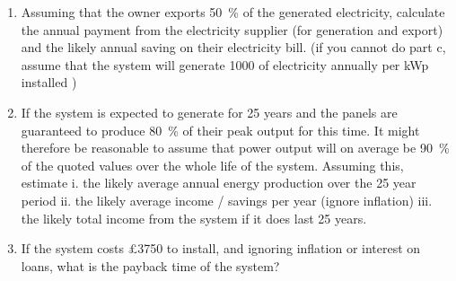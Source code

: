 \documentclass[crop=false,parskip=half]{scrartcl} %
\begin{document}
\begin{question}
\begin{enumerate} [label=\alph*)]
\item Assuming that the owner exports \SI{50}{\percent} of the generated electricity, calculate the annual payment from the electricity supplier (for generation and export) and the likely annual saving on their electricity bill. (if you cannot do part c, assume that the system will generate \SI{1000}{\kilowatthour} of electricity annually per kWp installed )
\item If the system is expected to generate for 25 years and the panels are guaranteed to produce \SI{80}{\percent} of their peak output for this time. It might therefore be reasonable to assume that power output will on average be \SI{90}{\percent} of the quoted values over the whole life of the system. Assuming this, estimate
i.	the likely average annual energy production over the 25 year period 
ii.	the likely average income / savings per year (ignore inflation)
iii.	the likely total income from the system if it does last 25 years.
\item If the system costs £3750 to install, and ignoring inflation or interest on loans, what is the payback time of the system?
\end{enumerate}
\end{question}
\end{document}
